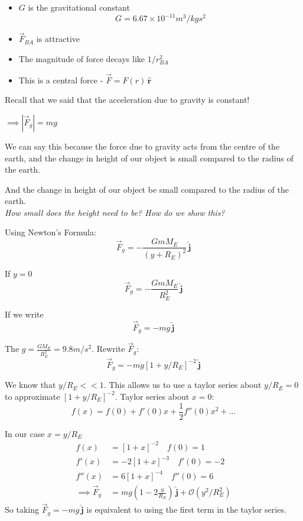 \documentclass[twoside]{scrartcl}
\let\oldhat\hat
\renewcommand{\hat}[1]{\,\oldhat{\boldsymbol{\mathbf{#1}}}}
\begin{document}
\begin{itemize}
\item $G$ is the gravitational constant 
\[G = 6.67 \times 10^{-11} m^3/kgs^2\]	
\item $\vec{F}_{BA}$ is attractive
\item The magnitude of force decays like $1/r^2_{BA}$ 
\item This is a central force - $\vec{F} = F(r)\hat{r}$
\end{itemize}

Recall that we said that the acceleration due to gravity is constant! 

$\implies |\vec{F}_g| = mg$

We can say this because the force due to gravity acts from the centre of the earth, and the change in height of our object is small compared to the radius of the earth.

And the change in height of our object be small compared to the radius of the earth.\\

\emph{How small does the height need to be? How do we show this?} 

\begin{center}
\end{center}

Using Newton's Formula:
\[\vec{F}_g = -\frac{GmM_E}{(y+R_E)^2}\hat{j}\]

If $y =0$
\[\vec{F}_g = -\frac{GmM_E}{R_E^2}\hat{j}\]

If we write 
\[\vec{F}_g = -mg\hat{j}\]

The $g = \frac{GM_E}{R^2_E} = 9.8m/s^2$. Rewrite $\vec{F}_g$:
\[\vec{F}_g = -mg[1 + y/R_E]^{-2}\hat{j}\]

We know that $y/R_E << 1$. This allows us to use a taylor series about $y/R_E = 0$ to approximate $[1 + y/R_E]^{-2}$. Taylor series about $x = 0$:
\[f(x) = f(0) + f'(0)x + \scriptstyle{\frac{1}{2}f''(0)x^2 + \dots }\]

In our case $x = y/R_E$
\[
\begin{aligned}
f(x) &= [1+x]^{-2} \quad f(0) = 1\\
f'(x) &= -2[1+x]^{-3} \quad f'(0) = -2\\
f''(x) &= 6[1+x]^{-4} \quad f''(0) = 6\\
\implies \vec{F}_g &= mg(1-2\frac{y}{R_E})\hat{j} + \mathcal{O}(y^2/R^2_E)
\end{aligned}
\]
So taking $\vec{F}_g = -mg\hat{j}$ is equivalent to using the first term in the taylor series.\\
\end{document}

